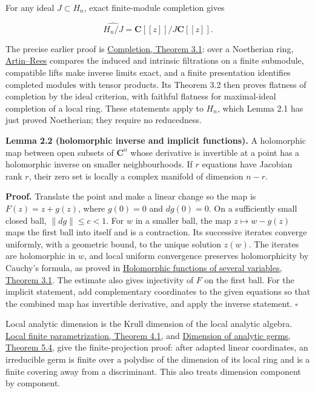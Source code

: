 \documentclass[11pt]{article}
\begin{document}
For any ideal \(J\subset H_n\), exact finite-module completion gives

\[
\widehat{H_n/J}=\mathbf C[[z]]/J\mathbf C[[z]].
\]

The precise earlier proof is
\href{../../AG-CA/AG-CA-19.html\#3-noetherian-exactness-tensoring-and-flatness}{Completion,
Theorem 3.1}: over a Noetherian ring, \href{../../AG-CA/AG-CA-03.html\#5-intersecting-a-filtration-with-a-submodule}{Artin--Rees} compares the induced
and intrinsic filtrations on a finite submodule, compatible lifts make
inverse limits exact, and a finite presentation identifies completed
modules with tensor products. Its Theorem 3.2 then proves flatness of
completion by the ideal criterion, with faithful flatness for
maximal-ideal completion of a local ring. These statements apply to
\(H_n\), which Lemma 2.1 has just proved Noetherian; they require no
reducedness.

\textbf{Lemma 2.2 (holomorphic inverse and implicit functions).} A
holomorphic map between open subsets of \(\mathbf C^n\) whose derivative
is invertible at a point has a holomorphic inverse on smaller
neighbourhoods. If \(r\) equations have Jacobian rank \(r\), their zero
set is locally a complex manifold of dimension \(n-r\).

\textbf{Proof.} Translate the point and make a linear change so the map
is \(F(z)=z+g(z)\), where \(g(0)=0\) and \(dg(0)=0\). On a sufficiently
small closed ball, \(\|dg\|\leq c<1\). For \(w\) in a smaller ball, the
map \(z\mapsto w-g(z)\) maps the first ball into itself and is a
contraction. Its successive iterates converge uniformly, with a
geometric bound, to the unique solution \(z(w)\). The iterates are
holomorphic in \(w\), and local uniform convergence preserves
holomorphicity by Cauchy's formula, as proved in \href{../../complex-analytic-spaces-and-coherent-sheaves/holomorphic-functions-of-several-variables.html\#3-limits-the-space-of-holomorphic-functions-and-montel-s-theorem}{Holomorphic functions of several variables, Theorem 3.1}. The estimate also gives injectivity
of \(F\) on the first ball. For the implicit statement, add
complementary coordinates to the given equations so that the combined
map has invertible derivative, and apply the inverse statement.
\(\square\)

Local analytic dimension is the Krull dimension of the local analytic
algebra.
\href{../../complex-analytic-spaces-and-coherent-sheaves/analytic-germs-local-parametrization-and-the-nullstellensatz.html\#4-the-local-parametrization-theorem}{Local
finite parametrization, Theorem 4.1}, and
\href{../../complex-analytic-spaces-and-coherent-sheaves/analytic-germs-local-parametrization-and-the-nullstellensatz.html\#5-the-nullstellensatz-and-dimension}{Dimension
of analytic germs, Theorem 5.4}, give the finite-projection proof: after
adapted linear coordinates, an irreducible germ is finite over a
polydisc of the dimension of its local ring and is a finite covering
away from a discriminant. This also treats dimension component by
component.
\end{document}
